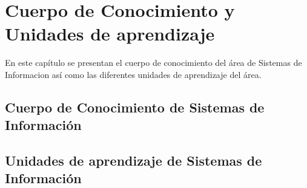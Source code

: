 \chapter{Cuerpo de Conocimiento y Unidades de aprendizaje}\label{chap:BOK}
En este capítulo se presentan el cuerpo de conocimiento del área de Sistemas de Informacion así
como las diferentes unidades de aprendizaje del área.

\section{Cuerpo de Conocimiento de Sistemas de Información}
%
%


\section{Unidades de aprendizaje de Sistemas de Información}\label{sec:LU}



